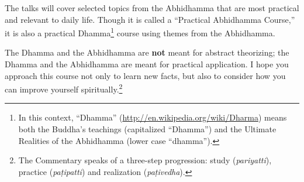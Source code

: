 The talks will cover selected topics from the Abhidhamma that are most practical and relevant to daily life. Though it is called a “Practical Abhidhamma Course,” it is also a practical Dhamma\footnote{In this context, “Dhamma” (\url{http://en.wikipedia.org/wiki/Dharma}) means both the Buddha’s teachings (capitalized “Dhamma”) and the Ultimate Realities of the Abhidhamma (lower case “dhamma”).} course using themes from the Abhidhamma.

The Dhamma and the Abhidhamma are \textbf{not} meant for abstract theorizing; the Dhamma and the Abhidhamma are meant for practical application. I hope you approach this course not only to learn new facts, but also to consider how you can improve yourself spiritually.\footnote{The Commentary speaks of a three-step progression: study (\textit{pariyatti}), practice (\textit{paṭipatti}) and realization (\textit{paṭivedha}).}